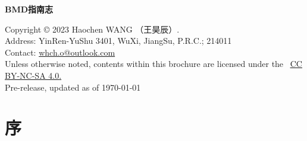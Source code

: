 \documentclass{article}
\begin{document}
\begin{titlepage} %



\begin{flushright} %
\fontsize{40}{10}\selectfont\textbf{BMD指南志} %
\end{flushright}


\begin{flushright} %
\fontsize{28}{0} %
\end{flushright}


\begin{flushright} %
\fontsize{20}{0} %
\end{flushright}


\begin{flushright} 
\fontsize{16}{16}\selectfont
\footnotesize{Copyright © 2023 Haochen WANG （王昊辰）.}\\
\footnotesize{Address: YinRen-YuShu 3401, WuXi, JiangSu, P.R.C.; 214011}\\
\footnotesize{Contact: \href{mailto:whch.o@outlook.com}{whch.o@outlook.com}}\\
\footnotesize{Unless otherwise noted, contents within this brochure are licensed under the \ccbyncsa\ \href{http://creativecommons.org/licenses/by-nc-sa/4.0/}{\uline{CC BY-NC-SA 4.0}.}}\\
\footnotesize{Pre-release, updated as of \today}
\end{flushright}


\end{titlepage} %

\fancyfoot[L]{\textcolor{light-gray}{Copyright © 2023 by Haochen WANG （王昊辰）}} %


\tableofcontents %


\newpage %

{\section{序}
\fontsize{11}{15}\selectfont %


\newpage
\newpage
\newpage
}
\end{document}

